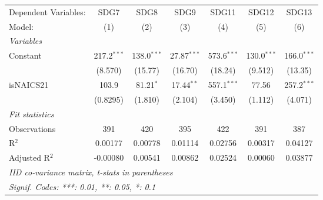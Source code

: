 
\begingroup
\centering
\begin{tabular}{lcccccc}
   \tabularnewline \midrule \midrule
   Dependent Variables: & SDG7          & SDG8          & SDG9          & SDG11         & SDG12         & SDG13\\  
   Model:               & (1)           & (2)           & (3)           & (4)           & (5)           & (6)\\  
   \midrule
   \emph{Variables}\\
   Constant             & 217.2$^{***}$ & 138.0$^{***}$ & 27.87$^{***}$ & 573.6$^{***}$ & 130.0$^{***}$ & 166.0$^{***}$\\   
                        & (8.570)       & (15.77)       & (16.70)       & (18.24)       & (9.512)       & (13.35)\\   
   isNAICS21            & 103.9         & 81.21$^{*}$   & 17.44$^{**}$  & 557.1$^{***}$ & 77.56         & 257.2$^{***}$\\   
                        & (0.8295)      & (1.810)       & (2.104)       & (3.450)       & (1.112)       & (4.071)\\   
   \midrule
   \emph{Fit statistics}\\
   Observations         & 391           & 420           & 395           & 422           & 391           & 387\\  
   R$^2$                & 0.00177       & 0.00778       & 0.01114       & 0.02756       & 0.00317       & 0.04127\\  
   Adjusted R$^2$       & -0.00080      & 0.00541       & 0.00862       & 0.02524       & 0.00060       & 0.03877\\  
   \midrule \midrule
   \multicolumn{7}{l}{\emph{IID co-variance matrix, t-stats in parentheses}}\\
   \multicolumn{7}{l}{\emph{Signif. Codes: ***: 0.01, **: 0.05, *: 0.1}}\\
\end{tabular}
\par\endgroup


